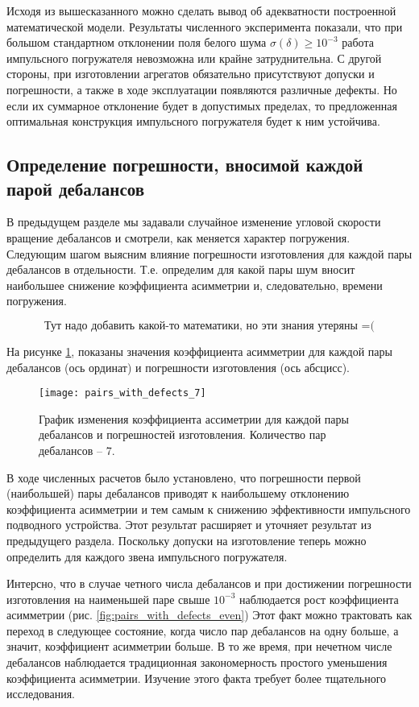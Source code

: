 Исходя из вышесказанного можно сделать вывод об адекватности построенной математической модели. Результаты численного
эксперимента показали, что при большом стандартном отклонении поля белого шума $\sigma(\delta) \geq 10^{-3}$ работа
импульсного погружателя невозможна или крайне затруднительна. С другой стороны, при изготовлении агрегатов обязательно
присутствуют допуски и погрешности, а также в ходе эксплуатации появляются различные дефекты. Но если их суммарное отклонение
будет в допустимых пределах, то предложенная оптимальная конструкция импульсного погружателя будет к ним устойчива.

\subsection{Определение погрешности, вносимой каждой парой дебалансов}

В предыдущем разделе мы задавали случайное изменение угловой скорости вращение дебалансов и смотрели, как меняется характер погружения.
Следующим шагом выясним влияние погрешности изготовления для каждой пары дебалансов в отдельности. Т.е. определим для какой пары шум вносит
наибольшее снижение коэффициента асимметрии и, следовательно, времени погружения.

\begin{equation}
    \text{Тут надо добавить какой-то математики, но эти знания утеряны =(}
\end{equation}

На рисунке \ref{fig:pairs_with_defects_7}, показаны значения коэффициента асимметрии для каждой
пары дебалансов (ось ординат) и погрешности изготовления (ось абсцисс).

\begin{figure}[ht]
    \centering
    \texttt{[image: pairs\_with\_defects\_7]}
    \caption{График изменения коэффициента ассиметрии для каждой пары дебалансов и погрешностей изготовления.
    Количество пар дебалансов -- 7.}
    \label{fig:pairs_with_defects_7}
\end{figure}

В ходе численных расчетов было установлено, что погрешности первой (наибольшей) пары дебалансов приводят к наибольшему отклонению коэффициента
асимметрии и тем самым к снижению эффективности импульсного подводного устройства. Этот результат расширяет и уточняет результат из предыдущего раздела.
Поскольку допуски на изготовление теперь можно определить для каждого звена импульсного погружателя.

Интерсно, что в случае четного числа дебалансов и при достижении погрешности изготовления на наименьшей паре свыше $10^{-3}$ наблюдается рост
коэффициента асимметрии (рис. \ref{fig:pairs_with_defects_even}) Этот факт можно трактовать как переход в следующее состояние,
когда число пар дебалансов на одну больше, а значит, коэффициент асимметрии больше. В то же время, при нечетном числе дебалансов
наблюдается традиционная закономерность простого уменьшения коэффициента асимметрии.
Изучение этого факта требует более тщательного исследования.

